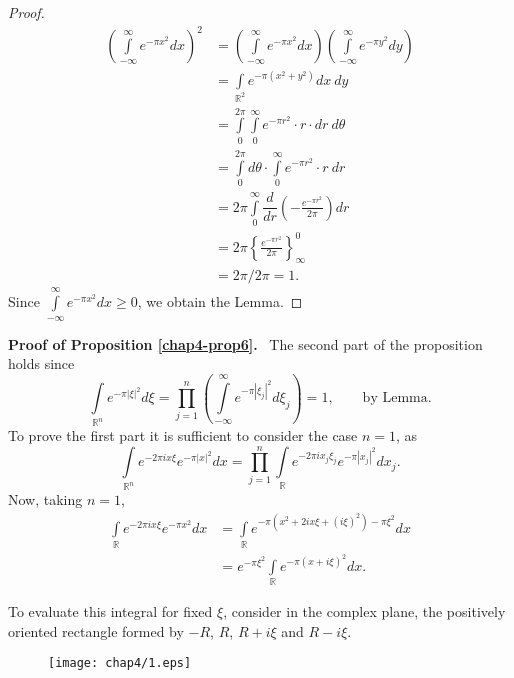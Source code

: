 \begin{proof}
\begin{align*}
\left(\int\limits^{\infty}_{-\infty}e^{-\pi x^{2}}dx\right)^{2} &=
\left(\int\limits^{\infty}_{-\infty}e^{-\pi
  x^{2}}dx\right)\left(\int\limits^{\infty}_{-\infty}e^{-\pi
  y^{2}}dy\right)\\[4pt]
&= \int\limits_{\mathbb{R}^{2}}e^{-\pi (x^{2}+y^{2})}dx \ dy\\[4pt]
&= \int\limits^{2\pi}_{0}\int\limits^{\infty}_{0}e^{-\pi r^{2}}\cdot
r\cdot dr \ d\theta\\[4pt]
&= \int\limits^{2\pi}_{0}d\theta\cdot \int\limits^{\infty}_{0}e^{-\pi
  r^{2}}\cdot r \ dr\\[4pt]
&= 2\pi \int\limits^{\infty}_{0}\dfrac{d}{dr}\left(-\frac{e^{-\pi
    r^{2}}}{2\pi}\right)dr\\[4pt]
&= 2\pi \left\{\frac{e^{-\pi r^{2}}}{2\pi}\right\}^{0}_{\infty}\\[4pt]
&= 2\pi/2 \pi=1.
\end{align*}
Since $\int\limits^{\infty}_{-\infty}e^{-\pi x^{2}}dx\geq 0$, we
obtain the Lemma.
\end{proof}

\noindent
{\bf Proof of Proposition \ref{chap4-prop6}.}~
The second part of the proposition holds since
$$
\int\limits_{\mathbb{R}^{n}}e^{-\pi|\xi|^{2}}d\xi
=\prod\limits^{n}_{j=1}
\left(\int\limits^{\infty}_{-\infty}e^{-\pi|\xi_{j}|^{2}}d\xi_{j}\right)=1,\qquad\text{by Lemma.}
$$
To prove the first part it is sufficient to consider the case $n=1$,
as
$$
\int\limits_{\mathbb{R}^{n}}e^{-2\pi ix\xi}e^{-\pi
  |x|^{2}}dx=\prod\limits^{n}_{j=1}\int\limits_{\mathbb{R}}e^{-2\pi ix_{j}\xi_{j}}e^{-\pi|x_{j}|^{2}}dx_{j}.
$$\pageoriginale
Now, taking $n=1$,
\begin{align*}
\int\limits_{\mathbb{R}}e^{-2\pi ix\xi}e^{-\pi x^{2}}dx &=
\int\limits_{\mathbb{R}}e^{-\pi (x^{2}+2ix\xi+(i\xi)^{2})-\pi
  \xi^{2}}dx\\[3pt]
&= e^{-\pi \xi^{2}}\int\limits_{\mathbb{R}}e^{-\pi (x+i\xi)^{2}}dx.
\end{align*}

To evaluate this integral for fixed $\xi$, consider in the complex
plane, the positively oriented rectangle formed by $-R$, $R$, $R+i\xi$
and $R-i\xi$.
\begin{figure}[H]
\centering
\texttt{[image: chap4/1.eps]}
\end{figure}

